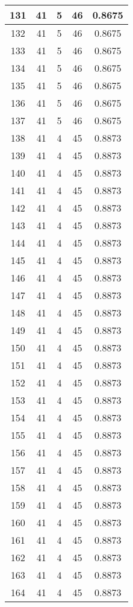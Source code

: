 \documentclass[letterpaper, 12pt]{article}
\begin{document}
\begin{longtable}{|c|c|c|c|c|}
\hline
131 & 41 & 5 & 46 & 0.8675 \\
\hline
132 & 41 & 5 & 46 & 0.8675 \\
\hline
133 & 41 & 5 & 46 & 0.8675 \\
\hline
134 & 41 & 5 & 46 & 0.8675 \\
\hline
135 & 41 & 5 & 46 & 0.8675 \\
\hline
136 & 41 & 5 & 46 & 0.8675 \\
\hline
137 & 41 & 5 & 46 & 0.8675 \\
\hline
138 & 41 & 4 & 45 & 0.8873 \\
\hline
139 & 41 & 4 & 45 & 0.8873 \\
\hline
140 & 41 & 4 & 45 & 0.8873 \\
\hline
141 & 41 & 4 & 45 & 0.8873 \\
\hline
142 & 41 & 4 & 45 & 0.8873 \\
\hline
143 & 41 & 4 & 45 & 0.8873 \\
\hline
144 & 41 & 4 & 45 & 0.8873 \\
\hline
145 & 41 & 4 & 45 & 0.8873 \\
\hline
146 & 41 & 4 & 45 & 0.8873 \\
\hline
147 & 41 & 4 & 45 & 0.8873 \\
\hline
148 & 41 & 4 & 45 & 0.8873 \\
\hline
149 & 41 & 4 & 45 & 0.8873 \\
\hline
150 & 41 & 4 & 45 & 0.8873 \\
\hline
151 & 41 & 4 & 45 & 0.8873 \\
\hline
152 & 41 & 4 & 45 & 0.8873 \\
\hline
153 & 41 & 4 & 45 & 0.8873 \\
\hline
154 & 41 & 4 & 45 & 0.8873 \\
\hline
155 & 41 & 4 & 45 & 0.8873 \\
\hline
156 & 41 & 4 & 45 & 0.8873 \\
\hline
157 & 41 & 4 & 45 & 0.8873 \\
\hline
158 & 41 & 4 & 45 & 0.8873 \\
\hline
159 & 41 & 4 & 45 & 0.8873 \\
\hline
160 & 41 & 4 & 45 & 0.8873 \\
\hline
161 & 41 & 4 & 45 & 0.8873 \\
\hline
162 & 41 & 4 & 45 & 0.8873 \\
\hline
163 & 41 & 4 & 45 & 0.8873 \\
\hline
164 & 41 & 4 & 45 & 0.8873 \\

\end{longtable}
\end{document}
